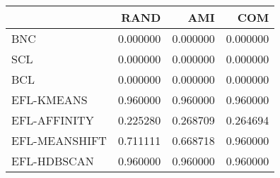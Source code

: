 \begin{tabular}{lrrr}
\toprule
 & RAND & AMI & COM \\
\midrule
BNC & 0.000000 & 0.000000 & 0.000000 \\
SCL & 0.000000 & 0.000000 & 0.000000 \\
BCL & 0.000000 & 0.000000 & 0.000000 \\
EFL-KMEANS & 0.960000 & 0.960000 & 0.960000 \\
EFL-AFFINITY & 0.225280 & 0.268709 & 0.264694 \\
EFL-MEANSHIFT & 0.711111 & 0.668718 & 0.960000 \\
EFL-HDBSCAN & 0.960000 & 0.960000 & 0.960000 \\
\bottomrule
\end{tabular}
